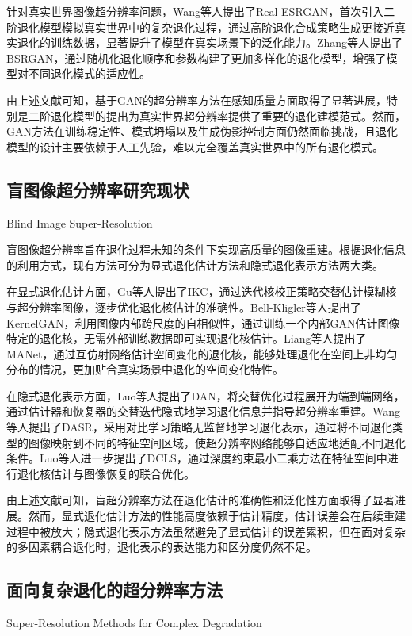 针对真实世界图像超分辨率问题，Wang等人提出了Real-ESRGAN\cite{wang2021realesrgan}，首次引入二阶退化模型模拟真实世界中的复杂退化过程，通过高阶退化合成策略生成更接近真实退化的训练数据，显著提升了模型在真实场景下的泛化能力。Zhang等人提出了BSRGAN\cite{zhang2021designing}，通过随机化退化顺序和参数构建了更加多样化的退化模型，增强了模型对不同退化模式的适应性。

由上述文献可知，基于GAN的超分辨率方法在感知质量方面取得了显著进展，特别是二阶退化模型的提出为真实世界超分辨率提供了重要的退化建模范式。然而，GAN方法在训练稳定性、模式坍塌以及生成伪影控制方面仍然面临挑战，且退化模型的设计主要依赖于人工先验，难以完全覆盖真实世界中的所有退化模式。

\subsection{盲图像超分辨率研究现状}{Blind Image Super-Resolution}

盲图像超分辨率旨在退化过程未知的条件下实现高质量的图像重建。根据退化信息的利用方式，现有方法可分为显式退化估计方法和隐式退化表示方法两大类。

在显式退化估计方面，Gu等人提出了IKC\cite{gu2019blind}，通过迭代核校正策略交替估计模糊核与超分辨率图像，逐步优化退化核估计的准确性。Bell-Kligler等人提出了KernelGAN\cite{bell2019kernelgan}，利用图像内部跨尺度的自相似性，通过训练一个内部GAN估计图像特定的退化核，无需外部训练数据即可实现退化核估计。Liang等人提出了MANet\cite{liang2021mutual}，通过互仿射网络估计空间变化的退化核，能够处理退化在空间上非均匀分布的情况，更加贴合真实场景中退化的空间变化特性。

在隐式退化表示方面，Luo等人提出了DAN\cite{luo2020unfolding}，将交替优化过程展开为端到端网络，通过估计器和恢复器的交替迭代隐式地学习退化信息并指导超分辨率重建。Wang等人提出了DASR\cite{wang2021unsupervised}，采用对比学习策略无监督地学习退化表示，通过将不同退化类型的图像映射到不同的特征空间区域，使超分辨率网络能够自适应地适配不同退化条件。Luo等人进一步提出了DCLS\cite{luo2022deep}，通过深度约束最小二乘方法在特征空间中进行退化核估计与图像恢复的联合优化。

由上述文献可知，盲超分辨率方法在退化估计的准确性和泛化性方面取得了显著进展。然而，显式退化估计方法的性能高度依赖于估计精度，估计误差会在后续重建过程中被放大；隐式退化表示方法虽然避免了显式估计的误差累积，但在面对复杂的多因素耦合退化时，退化表示的表达能力和区分度仍然不足。

\subsection{面向复杂退化的超分辨率方法}{Super-Resolution Methods for Complex Degradation}

